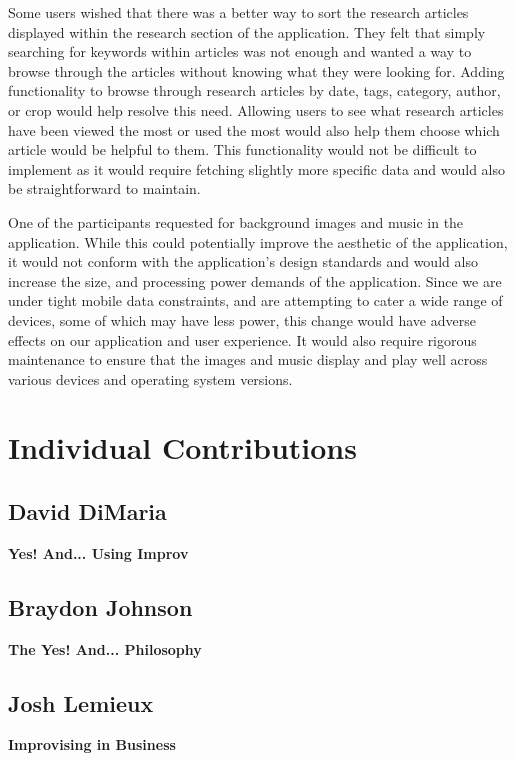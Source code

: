\documentclass[12pt,letterpaper]{article}
\begin{document}
Some users wished that there was a better way to sort the research articles displayed within the research section of the application. They felt that simply searching for keywords within articles was not enough and wanted a way to browse through the articles without knowing what they were looking for. Adding functionality to browse through research articles by date, tags, category, author, or crop would help resolve this need. Allowing users to see what research articles have been viewed the most or used the most would also help them choose which article would be helpful to them. This functionality would not be difficult to implement as it would require fetching slightly more specific data and would also be straightforward to maintain.\par
One of the participants requested for background images and music in the application. While this could potentially improve the aesthetic of the application, it would not conform with the application's design standards and would also increase the size, and processing power demands of the application. Since we are under tight mobile data constraints, and are attempting to cater a wide range of devices, some of which may have less power, this change would have adverse effects on our application and user experience. It would also require rigorous maintenance to ensure that the images and music display and play well across various devices and operating system versions. 

\clearpage
\section{Individual Contributions}
\subsection{David DiMaria}
\textbf{Yes! And... Using Improv}\par


\clearpage
\subsection{Braydon Johnson}
\textbf{The Yes! And... Philosophy}\par


\clearpage
\subsection{Josh Lemieux}
\textbf{Improvising in Business}\par
\end{document}
